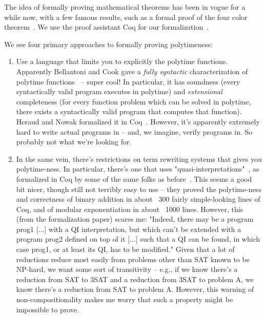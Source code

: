 \documentclass{article}
\begin{document}
The idea of formally proving mathematical theorems has been in vogue for a while
now, with a few famous results, such as a formal proof of the four color
theorem~\cite{gonthier2008}. We use the proof assistant Coq for our
formalization~\cite{coq2019}.

We see four primary approaches to formally proving polytimeness:
\begin{enumerate}
\item Use a language that limits you to explicitly the polytime functions.
  Apparently Bellantoni and Cook gave a \emph{fully syntactic} characterization
  of polytime functions~\cite{recursion92} -- super cool! In particular, it has
  soundness (every syntactically valid program executes in polytime) and
  \emph{extensional} completeness (for every function problem which can be
  solved in polytime, there exists a syntactically valid program that computes
  that function). Heraud and Nowak formalized it in Coq~\cite{formalization11}.
  However, it's apparently extremely hard to write actual programs in -- and, we
  imagine, verify programs in. So probably not what we're looking for.

\item In the same vein, there's restrictions on term rewriting systems that
  gives you polytime-ness. In particular, there's one that uses
  "quasi-interpretations"~\cite{quasi11}, as formalized in Coq by some of the
  same folks as before~\cite{formal18}. This seems a good bit nicer, though
  still not terribly easy to use -- they proved the polytime-ness and
  correctness of binary addition in about ~300 fairly simple-looking lines of
  Coq, and of modular exponentiation in about ~1000 lines. However, this (from
  the formalization paper) scares me: "Indeed, there may be a program prog1
  [...] with a QI interpretation, but which can’t be extended with a program
  prog2 defined on top of it [...] such that a QI can be found, in which case
  prog1, or at least its QI, has to be modified." Given that a lot of reductions
  reduce most easily from problems other than SAT known to be NP-hard, we want
  some sort of transitivity -- e.g., if we know there's a reduction from SAT to
  3SAT and a reduction from 3SAT to problem A, we know there's a reduction from
  SAT to problem A. However, this warning of non-compositionality makes me worry
  that such a property might be impossible to prove.


\end{enumerate}
\end{document}
